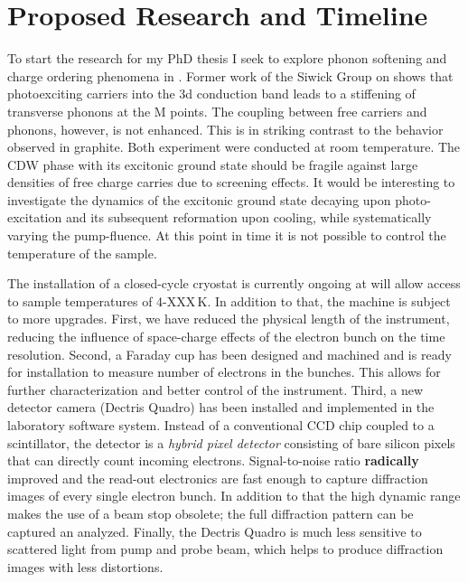\section{Proposed Research and Timeline}
To start the research for my PhD thesis I seek to explore phonon softening and charge ordering phenomena in \ts.
Former work of the Siwick Group on \ts\space shows that photoexciting carriers into the 3d conduction band leads to a stiffening of transverse phonons at the M points\cite{otto2021}.
The coupling between free carriers and phonons, however, is not enhanced.
This is in striking contrast to the behavior observed in graphite\cite{stern2018}.
Both experiment were conducted at room temperature.
The \ac{CDW} phase with its excitonic ground state should be fragile against large densities of free charge carries due to screening effects.
It would be interesting to investigate the dynamics of the excitonic ground state decaying upon photo-excitation and its subsequent reformation upon cooling, while systematically varying the pump-fluence.
At this point in time it is not possible to control the temperature of the sample.

The installation of a closed-cycle cryostat is currently ongoing at will allow access to sample temperatures of 4-XXX\,K.
In addition to that, the machine is subject to more upgrades.
First, we have reduced the physical length of the instrument, reducing the influence of space-charge effects of the electron bunch on the time resolution.
Second, a Faraday cup has been designed and machined and is ready for installation to measure number of electrons in the bunches.
This allows for further characterization and better control of the instrument.
Third, a new detector camera (Dectris Quadro) has been installed and implemented in the laboratory software system.
Instead of a conventional CCD chip coupled to a scintillator, the detector is a \emph{hybrid pixel detector} consisting of bare silicon pixels that can directly count incoming electrons.
Signal-to-noise ratio \textbf{radically} improved and the read-out electronics are fast enough to capture diffraction images of every single electron bunch.
In addition to that the high dynamic range makes the use of a beam stop obsolete; the full diffraction pattern can be captured an analyzed.
Finally, the Dectris Quadro is much less sensitive to scattered light from pump and probe beam, which helps to produce diffraction images with less distortions.

